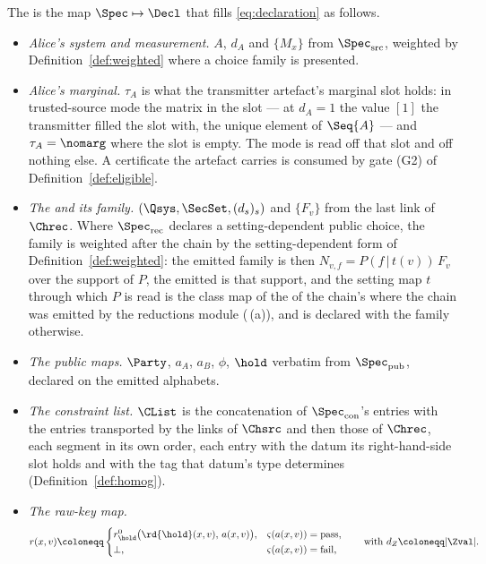\begin{definition}\label{def:compile}
The  is the map $\Spec\mapsto\Decl$ that fills
\eqref{eq:declaration} as follows.
\begin{itemize}[leftmargin=1.6em]
\item \emph{Alice's system and measurement.} $A$, $d_A$ and $\{M_x\}$ from
  $\Spec_{\mathrm{src}}$, weighted by Definition~\ref{def:weighted} where a
  choice family is presented.
\item \emph{Alice's marginal.} $\tau_A$ is what the transmitter artefact's
  marginal slot holds: in trusted-source mode the matrix in the slot --- at
  $d_A=1$ the value $[1]$ the transmitter filled the slot with, the unique
  element of $\Seq{A}$ --- and
  $\tau_A=\nomarg$ where the slot is empty. The mode is read off that slot and
  off nothing else. A certificate the artefact carries is consumed by gate
  (G2) of Definition~\ref{def:eligible}.
\item \emph{The  and its family.} $(\Qsys,\SecSet,(d_s)_s)$
  and $\{F_v\}$ from the last link of $\Chrec$. Where $\Spec_{\mathrm{rec}}$
  declares a setting-dependent public choice, the family is weighted
  after the chain by the setting-dependent form of
  Definition~\ref{def:weighted}: the emitted family is then
  $N_{v,f}=P(f\,|\,t(v))\,F_v$ over the support of $P$, the emitted  is that support, and the setting map $t$ through which $P$ is read
  is the class map of the  of the chain's  where
  the chain was emitted by the reductions module
  (\,(a)), and is declared with the family
  otherwise.
\item \emph{The public maps.} $\Party$, $a_A$, $a_B$, $\phi$, $\hold$
  verbatim from $\Spec_{\mathrm{pub}}$, declared on the emitted alphabets.
\item \emph{The constraint list.} $\CList$ is the concatenation of
  $\Spec_{\mathrm{con}}$'s entries with the entries transported by the links
  of $\Chsrc$ and then those of $\Chrec$, each segment in its own order, each
  entry with the datum its right-hand-side slot holds and with the tag that
  datum's type determines (Definition~\ref{def:homog}).
\item \emph{The raw-key map.}
\begin{equation}\label{eq:rdef}
  r(x,v)\coloneqq
  \begin{cases}
    r^{0}_{\hold}\big(\rd{\hold}(x,v),\,a(x,v)\big),
      & \varsigma(a(x,v))=\mathrm{pass},\\[0.3ex]
    \perp, & \varsigma(a(x,v))=\mathrm{fail},
  \end{cases}
  \qquad\text{with }d_Z\coloneqq|\Zval| .
\end{equation}
\end{itemize}


\end{definition}
